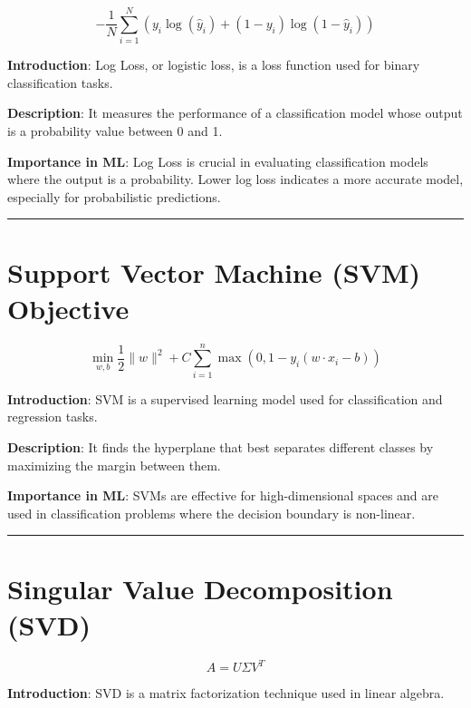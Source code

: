 \documentclass[
  12 pt,
  a4paper,
]{book}
\numberwithin{equation}{section}
\theoremstyle{plain}      %
\theoremstyle{definition} %
\theoremstyle{remark}     %
\theoremstyle{note}         %
\begin{document}
\[
-\frac{1}{N} \sum_{i=1}^N \left( y_i \log(\hat{y}_i) + (1 - y_i) \log(1 - \hat{y}_i) \right)
\]

\textbf{Introduction}: Log Loss, or logistic loss, is a loss function
used for binary classification tasks.

\textbf{Description}: It measures the performance of a classification
model whose output is a probability value between 0 and 1.

\textbf{Importance in ML}: Log Loss is crucial in evaluating
classification models where the output is a probability. Lower log loss
indicates a more accurate model, especially for probabilistic
predictions.

\begin{center}\rule{0.5\linewidth}{0.5pt}\end{center}

\newpage

\hypertarget{support-vector-machine-svm-objective}{%
\chapter{Support Vector Machine (SVM)
Objective}\label{support-vector-machine-svm-objective}}

\[
\min_{w, b} \frac{1}{2} \|w\|^2 + C \sum_{i=1}^n \max(0, 1 - y_i (w \cdot x_i - b))
\]

\textbf{Introduction}: SVM is a supervised learning model used for
classification and regression tasks.

\textbf{Description}: It finds the hyperplane that best separates
different classes by maximizing the margin between them.

\textbf{Importance in ML}: SVMs are effective for high-dimensional
spaces and are used in classification problems where the decision
boundary is non-linear.

\begin{center}\rule{0.5\linewidth}{0.5pt}\end{center}

\newpage

\hypertarget{singular-value-decomposition-svd}{%
\chapter{Singular Value Decomposition
(SVD)}\label{singular-value-decomposition-svd}}

\[
A = U \Sigma V^T
\]

\textbf{Introduction}: SVD is a matrix factorization technique used in
linear algebra.
\end{document}
